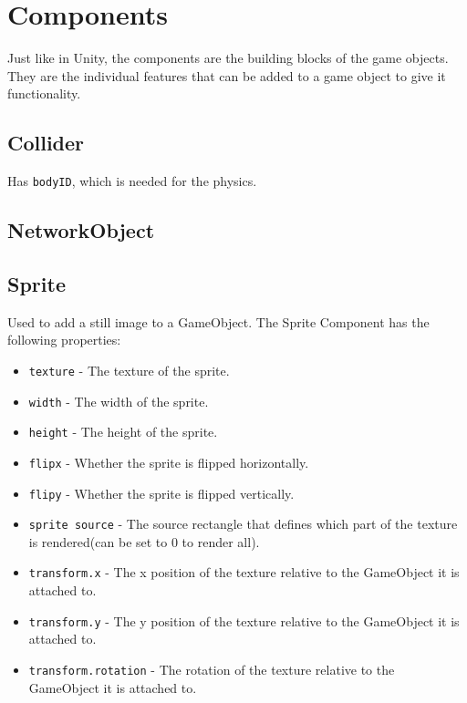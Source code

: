 \section{Components}
Just like in Unity, the components are the building blocks of the game objects.
They are the individual features that can be added to a game object to give it functionality.

\subsection{Collider}
Has \texttt{bodyID}, which is needed for the physics.

\subsection{NetworkObject}

\subsection{Sprite}
Used to add a still image to a GameObject.
The Sprite Component has the following properties:
\begin{itemize}
    \item \texttt{texture} - The texture of the sprite.
    \item \texttt{width} - The width of the sprite.
    \item \texttt{height} - The height of the sprite.
    \item \texttt{flipx} - Whether the sprite is flipped horizontally.
    \item \texttt{flipy} - Whether the sprite is flipped vertically.
    \item \texttt{sprite source} - The source rectangle that defines which part of the texture is rendered(can be set to 0 to render all).
    \item \texttt{transform.x} - The x position of the texture relative to the GameObject it is attached to.
    \item \texttt{transform.y} - The y position of the texture relative to the GameObject it is attached to.
    \item \texttt{transform.rotation} - The rotation of the texture relative to the GameObject it is attached to.
\end{itemize}

